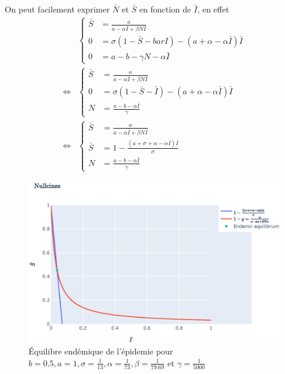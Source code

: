 \documentclass[11pt]{article}
\newcommand{\ssi}{\Longleftrightarrow}
\begin{document}
On peut facilement exprimer $\bar N$ et $\bar S$ en fonction de $\bar I$, en effet 
\begin{align*}
	&\left\{
	\begin{aligned}
		\bar S &= \frac{a}  {a - \alpha \bar I + \beta N \bar I}\\
		0 &= \sigma (1- \bar S - bar I) - (a + \alpha- \alpha \bar I) \bar I\\
		0 &= a -b - \gamma N -\alpha \bar I
	\end{aligned}\right. \\
	\ssi& \left\{
	\begin{aligned}
		\bar S &= \frac{a}  {a - \alpha \bar I + \beta N \bar I}\\
		0 &= \sigma (1- \bar S - \bar I) - (a + \alpha- \alpha \bar I) \bar I\\
		N &= \frac{a -b  -\alpha \bar I}{\gamma}
	\end{aligned}\right. \\
	\ssi& \left\{
	\begin{aligned}
		\bar S &= \frac{a}  {a - \alpha \bar I + \beta N \bar I}\\
		\bar S &= 1 -\frac{(a + \sigma + \alpha - \alpha \bar I) \bar I}{\sigma}\\
		N &= \frac{a -b  -\alpha \bar I}{\gamma}
	\end{aligned}\right.
\end{align*}

\begin{figure}[ht]
\centering
	\includegraphics[width=0.8\linewidth]{../figures/nullclines.eps}
	\caption{\'Equilibre end\'emique de l'\'epidemie pour $b =0.5, a = 1, \sigma = \frac{1}{13}, \alpha = \frac{1}{73}, \beta = \frac{1}{79.69}$ et $\gamma = \frac{1}{5000}$}
\label{fig:equilibre endemique}
\end{figure}
\end{document}
